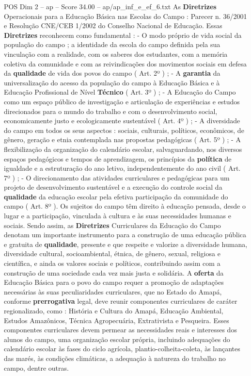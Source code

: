 \begin{textsample}{POS Dim 2 – ap – Score 34.00 – ap/ap\_inf\_e\_ef\_6.txt}
As \textbf{Diretrizes} Operacionais para a Educação Básica nas Escolas do Campo : Parecer n. 36/2001 e Resolução CNE/CEB 1/2002 do Conselho Nacional de Educação.
Essas \textbf{Diretrizes} reconhecem como fundamental : - O modo próprio de vida social da população do campo ; a identidade da escola do campo definida pela sua vinculação com a realidade, com os saberes dos estudantes, com a memória coletiva da comunidade e com as reivindicações dos movimentos sociais em defesa da \textbf{qualidade} de vida dos povos do campo ( Art. 2º ) ; - A \textbf{garantia} da universalização do acesso da população do campo à Educação Básica e à Educação Profissional de Nível \textbf{Técnico} ( Art. 3º ) ; - A Educação do Campo como um espaço público de investigação e articulação de experiências e estudos direcionados para o mundo do trabalho e com o desenvolvimento social, economicamente justo e ecologicamente sustentável ( Art. 4º ) ; - A diversidade do campo em todos os seus aspectos : sociais, culturais, políticos, econômicos, de gênero, geração e etnia contemplada nas propostas pedagógicas ( Art. 5º ) ; - A flexibilização da organização do calendário escolar, salvaguardando, nos diversos espaços pedagógicos e tempos de aprendizagem, os princípios da \textbf{política} de igualdade e a estruturação do ano letivo, independentemente do ano civil ( Art. 7º ) ; - O direcionamento das atividades curriculares e pedagógicas para um projeto de desenvolvimento sustentável e a execução do controle social da \textbf{qualidade} da educação escolar pela efetiva participação da comunidade do campo ( Art. 8º ).
Os sujeitos do campo têm direito à educação pensada, desde o lugar e a participação, vinculada à cultura e às suas necessidades humanas e sociais.
Sendo assim, as \textbf{Diretrizes} Curriculares da Educação do Campo denotam um importante instrumento para a construção de uma educação pública e gratuita de \textbf{qualidade}, presente e que respeite e valorize a diversidade humana, diversidade cultural, socioambiental, étnica, de gênero, sexual, religiosa e científica, e ainda os valores sociais e políticos, contribuindo assim com a construção de uma sociedade cada vez mais justa e solidária.
A \textbf{oferta} da Educação Básica para o povo do campo requer a promoção de adaptações necessárias às suas peculiaridades curriculares, que no Estado do Amapá, conforme \textbf{prerrogativa} legal, deve reunir componentes curriculares de caráter regionalizado, como : História e Cultura do Amapá, Educação Ambiental, Estudos Amazônicos, Técnica Agropecuária, Extrativista e Pesqueira.
Esses componentes curriculares devem permear as necessidades reais e interesses dos alunos do campo, uma organização escolar própria, incluindo adequações do calendário escolar às fases do ciclo agrícola, plantio-colheita-coleta, às lançantes das marés, às condições climáticas, a adequação à natureza do trabalho no campo, dentre outras.

\end{textsample}

